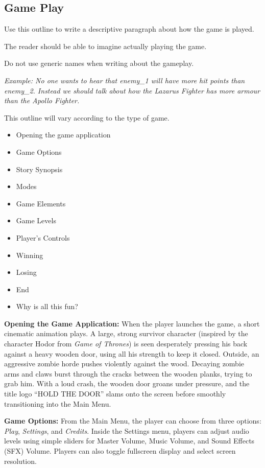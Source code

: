 \subsection{Game Play}
\begin{guidance}
Use this outline to write a descriptive paragraph about how the game is played.

The reader should be able to imagine actually playing the game.

Do not use generic names when writing about the gameplay.

\textit{Example: No one wants to hear that enemy\_1 will have more hit points than enemy\_2. Instead we should talk about how the Lazarus Fighter has more armour than the Apollo Fighter.}

This outline will vary according to the type of game.

\begin{itemize}[label=\textbullet]
  \item Opening the game application
  \item Game Options
  \item Story Synopsis
  \item Modes
  \item Game Elements
  \item Game Levels
  \item Player’s Controls
  \item Winning
  \item Losing
  \item End
  \item Why is all this fun?
\end{itemize}
\end{guidance}
\textbf{Opening the Game Application:} When the player launches the game, a short cinematic animation plays. A large, strong survivor character (inspired by the character Hodor from \textit{Game of Thrones}) is seen desperately pressing his back against a heavy wooden door, using all his strength to keep it closed. Outside, an aggressive zombie horde pushes violently against the wood. Decaying zombie arms and claws burst through the cracks between the wooden planks, trying to grab him. With a loud crash, the wooden door groans under pressure, and the title logo {``HOLD THE DOOR''} slams onto the screen before smoothly transitioning into the Main Menu.

\textbf{Game Options:} From the Main Menu, the player can choose from three options: \textit{Play}, \textit{Settings}, and \textit{Credits}. Inside the Settings menu, players can adjust audio levels using simple sliders for Master Volume, Music Volume, and Sound Effects (SFX) Volume. Players can also toggle fullscreen display and select screen resolution.

